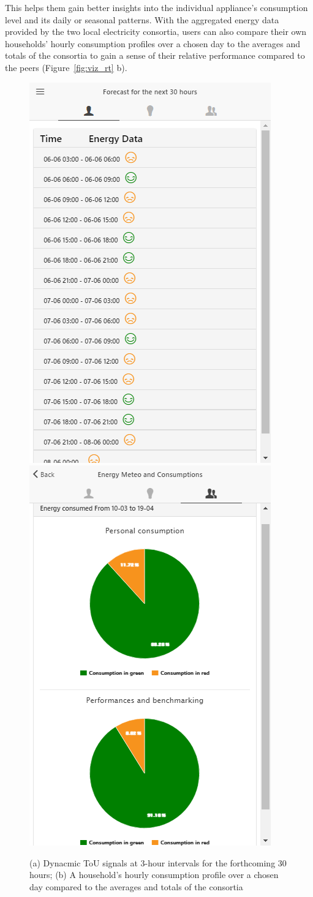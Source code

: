 This helps them gain better insights into the individual appliance's consumption level and its daily or seasonal patterns. 
%
With the aggregated energy data provided by the two local electricity consortia, users can also  compare their own households' hourly consumption profiles over a chosen day to the averages and totals of the consortia to gain a sense of their relative performance compared to the peers (Figure~\ref{fig:viz_rt} b).

\begin{figure}[t]
      \sidecaption[t]
        \includegraphics[width=.3\linewidth]{img/touprediction.png}
         \includegraphics[width=.3\linewidth]{img/touperformancechart_indivcoll.png}
      \caption{(a) Dynacmic ToU signals at 3-hour intervals for the forthcoming 30 hours;  (b) 
      A household's hourly consumption profile over a chosen day compared to the averages and totals of the consortia
}
\label{fig:tou}
\end{figure}

